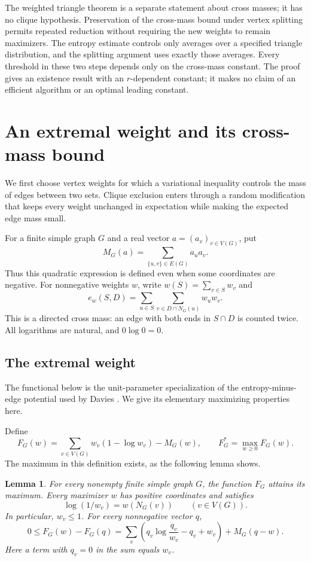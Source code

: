 \documentclass[11pt]{article}
\newtheorem{lemma}[theorem]{Lemma}
\theoremstyle{definition}
\theoremstyle{remark}
\numberwithin{equation}{section}
\begin{document}
The weighted triangle theorem is a separate statement about cross masses;
it has no clique hypothesis. Preservation of the cross-mass bound under
vertex splitting permits repeated reduction without requiring the new weights to
remain maximizers. The entropy estimate controls only averages over a
specified triangle distribution, and the splitting argument uses exactly
those averages. Every threshold in these two steps depends only on the
cross-mass constant. The proof gives an existence result with an
$r$-dependent constant; it makes no claim of an efficient algorithm or
an optimal leading constant.

\section{An extremal weight and its cross-mass bound}
\label{sec:optimizer}

We first choose vertex weights for which a variational inequality controls
the mass of edges between two sets.  Clique exclusion enters through a
random modification that keeps every weight unchanged in expectation while
making the expected edge mass small.

For a finite simple graph $G$ and a real vector $a=(a_v)_{v\in V(G)}$, put
\[
 M_G(a)=\sum_{\{u,v\}\in E(G)}a_ua_v.
\]
Thus this quadratic expression is defined even when some coordinates are
negative.  For nonnegative weights $w$, write $w(S)=\sum_{v\in S}w_v$ and
\[
 e_w(S,D)=\sum_{u\in S}\sum_{v\in D\cap N_G(u)}w_uw_v.
\]
This is a directed cross mass: an edge with both ends in $S\cap D$ is
counted twice.  All logarithms are natural, and $0\log 0=0$.

\subsection{The extremal weight}

The functional below is the unit-parameter specialization of the
entropy-minus-edge potential used by Davies
\cite[Section~3.3, proof of Theorem~17]{Davies2026}.
We give its elementary maximizing properties here.

Define
\[
 F_G(w)=\sum_{v\in V(G)}w_v(1-\log w_v)-M_G(w),
 \qquad F_G^*=\max_{w\ge0}F_G(w).
\]
The maximum in this definition exists, as the following lemma shows.

\begin{lemma}\label{lem:optimizer}
For every nonempty finite simple graph $G$, the function $F_G$ attains its
maximum.  Every maximizer $w$ has positive coordinates and satisfies
\begin{equation}\label{eq:stationarity}
 \log(1/w_v)=w(N_G(v)) \qquad(v\in V(G)).
\end{equation}
In particular, $w_v\le1$.  For every nonnegative vector $q$,
\begin{equation}\label{eq:optimizer-divergence}
 0\le F_G(w)-F_G(q)
 =\sum_v\left(q_v\log\frac{q_v}{w_v}-q_v+w_v\right)
   +M_G(q-w).
\end{equation}
Here a term with $q_v=0$ in the sum equals $w_v$.
\end{lemma}
\end{document}
